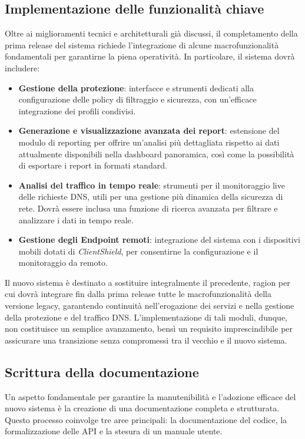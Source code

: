 \subsection{Implementazione delle funzionalità chiave}
Oltre ai miglioramenti tecnici e architetturali già discussi, il completamento della prima release del sistema richiede l’integrazione di alcune macrofunzionalità fondamentali per garantirne la piena operatività. In particolare, il sistema dovrà includere:
\begin{itemize}
  \item \textbf{Gestione della protezione}: interfacce e strumenti dedicati alla configurazione delle policy di filtraggio e sicurezza, con un'efficace integrazione dei profili condivisi.
  \item \textbf{Generazione e visualizzazione avanzata dei report}: estensione del modulo di reporting per offrire un’analisi più dettagliata rispetto ai dati attualmente disponibili nella dashboard panoramica, così come la possibilità di esportare i report in formati standard.
  \item \textbf{Analisi del traffico in tempo reale}: strumenti per il monitoraggio live delle richieste DNS, utili per una gestione più dinamica della sicurezza di rete. Dovrà essere inclusa una funzione di ricerca avanzata per filtrare e analizzare i dati in tempo reale.
  \item \textbf{Gestione degli Endpoint remoti}: integrazione del sistema con i dispositivi mobili dotati di \textit{ClientShield}, per consentirne la configurazione e il monitoraggio da remoto.
\end{itemize}
%
Il nuovo sistema è destinato a sostituire integralmente il precedente, ragion per cui dovrà integrare fin dalla prima release tutte le macrofunzionalità della versione legacy, garantendo continuità nell’erogazione dei servizi e nella gestione della protezione e del traffico DNS. L’implementazione di tali moduli, dunque, non costituisce un semplice avanzamento, bensì un requisito imprescindibile per assicurare una transizione senza compromessi tra il vecchio e il nuovo sistema.

\subsection{Scrittura della documentazione}
Un aspetto fondamentale per garantire la manutenibilità e l’adozione efficace del nuovo sistema è la creazione di una documentazione completa e strutturata. Questo processo coinvolge tre aree principali: la documentazione del codice, la formalizzazione delle API e la stesura di un manuale utente.

